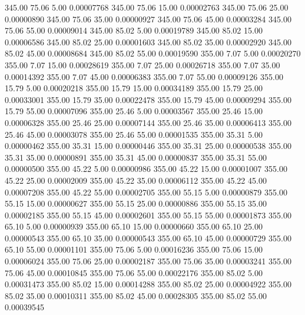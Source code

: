     345.00     75.06      5.00     0.00007768
    345.00     75.06     15.00     0.00002763
    345.00     75.06     25.00     0.00000890
    345.00     75.06     35.00     0.00000927
    345.00     75.06     45.00     0.00003284
    345.00     75.06     55.00     0.00009014
    345.00     85.02      5.00     0.00019789
    345.00     85.02     15.00     0.00006586
    345.00     85.02     25.00     0.00001603
    345.00     85.02     35.00     0.00002920
    345.00     85.02     45.00     0.00008684
    345.00     85.02     55.00     0.00019590
    355.00      7.07      5.00     0.00020270
    355.00      7.07     15.00     0.00028619
    355.00      7.07     25.00     0.00026718
    355.00      7.07     35.00     0.00014392
    355.00      7.07     45.00     0.00006383
    355.00      7.07     55.00     0.00009126
    355.00     15.79      5.00     0.00020218
    355.00     15.79     15.00     0.00034189
    355.00     15.79     25.00     0.00033001
    355.00     15.79     35.00     0.00022478
    355.00     15.79     45.00     0.00009294
    355.00     15.79     55.00     0.00007096
    355.00     25.46      5.00     0.00003567
    355.00     25.46     15.00     0.00006328
    355.00     25.46     25.00     0.00007144
    355.00     25.46     35.00     0.00006413
    355.00     25.46     45.00     0.00003078
    355.00     25.46     55.00     0.00001535
    355.00     35.31      5.00     0.00000462
    355.00     35.31     15.00     0.00000446
    355.00     35.31     25.00     0.00000538
    355.00     35.31     35.00     0.00000891
    355.00     35.31     45.00     0.00000837
    355.00     35.31     55.00     0.00000500
    355.00     45.22      5.00     0.00000986
    355.00     45.22     15.00     0.00001007
    355.00     45.22     25.00     0.00002009
    355.00     45.22     35.00     0.00006112
    355.00     45.22     45.00     0.00007208
    355.00     45.22     55.00     0.00002705
    355.00     55.15      5.00     0.00000879
    355.00     55.15     15.00     0.00000627
    355.00     55.15     25.00     0.00000886
    355.00     55.15     35.00     0.00002185
    355.00     55.15     45.00     0.00002601
    355.00     55.15     55.00     0.00001873
    355.00     65.10      5.00     0.00000939
    355.00     65.10     15.00     0.00000660
    355.00     65.10     25.00     0.00000543
    355.00     65.10     35.00     0.00000543
    355.00     65.10     45.00     0.00000729
    355.00     65.10     55.00     0.00001101
    355.00     75.06      5.00     0.00016236
    355.00     75.06     15.00     0.00006024
    355.00     75.06     25.00     0.00002187
    355.00     75.06     35.00     0.00003241
    355.00     75.06     45.00     0.00010845
    355.00     75.06     55.00     0.00022176
    355.00     85.02      5.00     0.00031473
    355.00     85.02     15.00     0.00014288
    355.00     85.02     25.00     0.00004922
    355.00     85.02     35.00     0.00010311
    355.00     85.02     45.00     0.00028305
    355.00     85.02     55.00     0.00039545
